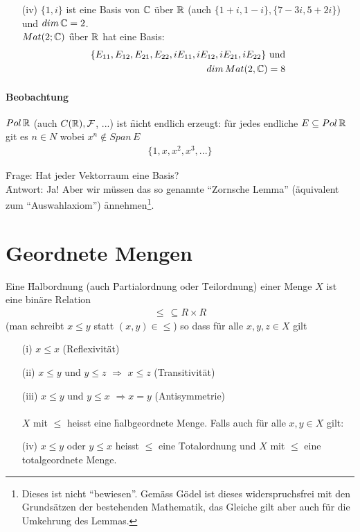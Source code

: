 \begin{itemize}
\item[(iv)] $\{1, i\}$ ist eine Basis von $\mathbb{C}$ über $\mathbb{R}$ (auch $\{1+i, 1-i\}, \{7-3i, 5+2i\}$) und $dim\, \mathbb{C} = 2$. \\
$Mat(2; \mathbb{C})$ \f{über} $\mathbb{R}$ hat eine Basis: 
\begin{align}
\{E_{11}, E_{12}, E_{21}, E_{22}, i E_{11}, i E_{12}, i E_{21}, i E_{22}\} \text{ und} \\ dim\, Mat(2, \mathbb{C}) = 8
\end{align}
\end{itemize}

\paragraph{Beobachtung}
$Pol\, \mathbb{R}$ (auch $C(\mathbb{R}), \mathcal{F}$, ...) ist \f{nicht} endlich erzeugt: für jedes endliche $E \subseteq Pol\, \mathbb{R}$ git es $n \in N$ wobei $x^n \notin Span\, E$
\begin{align}
\{1, x, x^2, x^3, ...\}
\end{align}

\noindent \f{Frage:} Hat jeder Vektorraum eine Basis?\\
\f{Antwort:} Ja! Aber wir müssen das so genannte ``Zornsche Lemma'' (äquivalent zum ``Auswahlaxiom'') \f{annehmen}\footnote{Dieses ist nicht ``bewiesen''. Gemäss Gödel ist dieses widerspruchsfrei mit den Grundsätzen der bestehenden Mathematik, das Gleiche gilt aber auch für die Umkehrung des Lemmas.}.
\section{Geordnete Mengen}
Eine \f{Halbordnung} (auch \f{Partialordnung} oder \f{Teilordnung}) einer Menge $X$ ist eine binäre Relation 
\begin{align}
\leq \, \subseteq R \times R
\end{align}
(man schreibt $x \leq y$ statt $(x, y) \in  \leq$)
so dass für alle $x, y, z \in X$ gilt
\begin{itemize}
\item[(i)] $x \leq x$ (Reflexivität)
\item[(ii)] $x \leq y$ und $y\leq z$ $\Rightarrow$ $x \leq z$ (Transitivität)
\item[(iii)] $x \leq y$ und $y \leq x$ $\Rightarrow x = y$ (Antisymmetrie) \\\\
\noindent $X$ mit $\leq$ heisst eine \f{halbgeordnete Menge}. Falls auch für alle $x, y \in X$ gilt:
\item[(iv)] $x \leq y$ oder $y \leq x$ heisst $\leq$ eine \f{Totalordnung} und $X$ mit $\leq$ eine totalgeordnete Menge.
\end{itemize}


